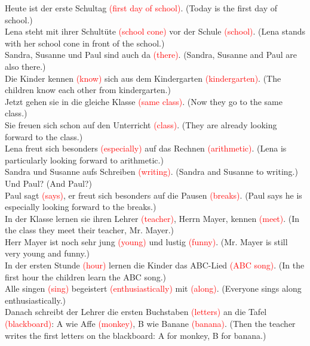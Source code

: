 \documentclass{article}
\begin{document}
\begin{enumerate}
    Heute ist der erste Schultag \textcolor{red}{(first day of school)}. (Today is the first day of school.) \\
    Lena steht mit ihrer Schultüte \textcolor{red}{(school cone)} vor der Schule \textcolor{red}{(school)}. (Lena stands with her school cone in front of the school.) \\
    Sandra, Susanne und Paul sind auch da \textcolor{red}{(there)}. (Sandra, Susanne and Paul are also there.) \\
    Die Kinder kennen \textcolor{red}{(know)} sich aus dem Kindergarten \textcolor{red}{(kindergarten)}. (The children know each other from kindergarten.) \\
    Jetzt gehen sie in die gleiche Klasse \textcolor{red}{(same class)}. (Now they go to the same class.) \\
    Sie freuen sich schon auf den Unterricht \textcolor{red}{(class)}. (They are already looking forward to the class.) \\
    Lena freut sich besonders \textcolor{red}{(especially)} auf das Rechnen \textcolor{red}{(arithmetic)}. (Lena is particularly looking forward to arithmetic.) \\
    Sandra und Susanne aufs Schreiben \textcolor{red}{(writing)}. (Sandra and Susanne to writing.) \\
    Und Paul? (And Paul?) \\
    Paul sagt \textcolor{red}{(says)}, er freut sich besonders auf die Pausen \textcolor{red}{(breaks)}. (Paul says he is especially looking forward to the breaks.) \\
    In der Klasse lernen sie ihren Lehrer \textcolor{red}{(teacher)}, Herrn Mayer, kennen \textcolor{red}{(meet)}. (In the class they meet their teacher, Mr. Mayer.) \\
    Herr Mayer ist noch sehr jung \textcolor{red}{(young)} und lustig \textcolor{red}{(funny)}. (Mr. Mayer is still very young and funny.) \\
    In der ersten Stunde \textcolor{red}{(hour)} lernen die Kinder das ABC-Lied \textcolor{red}{(ABC song)}. (In the first hour the children learn the ABC song.) \\
    Alle singen \textcolor{red}{(sing)} begeistert \textcolor{red}{(enthusiastically)} mit \textcolor{red}{(along)}. (Everyone sings along enthusiastically.) \\
    Danach schreibt der Lehrer die ersten Buchstaben \textcolor{red}{(letters)} an die Tafel \textcolor{red}{(blackboard)}: A wie Affe \textcolor{red}{(monkey)}, B wie Banane \textcolor{red}{(banana)}. (Then the teacher writes the first letters on the blackboard: A for monkey, B for banana.) \\

\end{enumerate}
\end{document}
